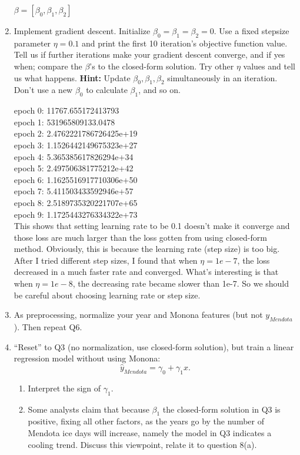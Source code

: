 \documentclass[a4paper]{article}
\theoremstyle{definition}
\newenvironment{soln}{
    \leavevmode\color{blue}\ignorespaces
}{}
\begin{document}
\begin{enumerate}
\begin{soln}
$\beta = [\beta_0, \beta_1, \beta_2]$
\end{soln}

\item
Implement gradient descent.  Initialize $\beta_0= \beta_1= \beta_2=0$.  Use a fixed stepsize parameter $\eta=0.1$ and print the first 10 iteration's objective function value.
Tell us if further iterations make your gradient descent converge, and if yes when; compare the $\beta$'s to the closed-form solution.
Try other $\eta$ values and tell us what happens.
\textbf{Hint:} Update $\beta_0, \beta_1, \beta_2$ simultaneously in an iteration.  Don't use a new $\beta_0$ to calculate $\beta_1$, and so on.

\begin{soln}
epoch 0:  11767.655172413793\\
epoch 1:  531965809133.0478\\
epoch 2:  2.4762221786726425e+19\\
epoch 3:  1.1526442149675323e+27\\
epoch 4:  5.365385617826294e+34\\
epoch 5:  2.497506381775212e+42\\
epoch 6:  1.1625516917710306e+50\\
epoch 7:  5.411503433592946e+57\\
epoch 8:  2.5189735320221707e+65\\
epoch 9:  1.1725443276334322e+73\\

This shows that setting learning rate to be 0.1 doesn't make it converge and those loss are much larger than the loss gotten from using closed-form method.
Obviously, this is because the learning rate (step size) is too big. After I tried different step sizes, I found that when $\eta = 1e-7$, the loss decreased in a much faster rate and converged. What's interesting is that when $\eta = 1e-8$, the decreasing rate became slower than 1e-7. So we should be careful about choosing learning rate or step size.

\end{soln}


\item
As preprocessing, normalize your year and Monona features (but not $y_{Mendota}$).
Then repeat Q6.

\item 
``Reset'' to Q3 (no normalization,  use closed-form solution), but train a linear regression model without using Monona:
$$\hat y_{Mendota} = \gamma_0 + \gamma_1 x.$$
  \begin{enumerate}
  \item Interpret the sign of $\gamma_1$.
  \item Some analysts claim that because $\beta_1$ the closed-form solution in Q3 is positive, fixing all other factors, as the years go by the number of Mendota ice days will increase, namely the model in Q3 indicates a cooling trend. Discuss this viewpoint, relate it to question 8(a).
  \end{enumerate}


\end{enumerate}
\end{document}
